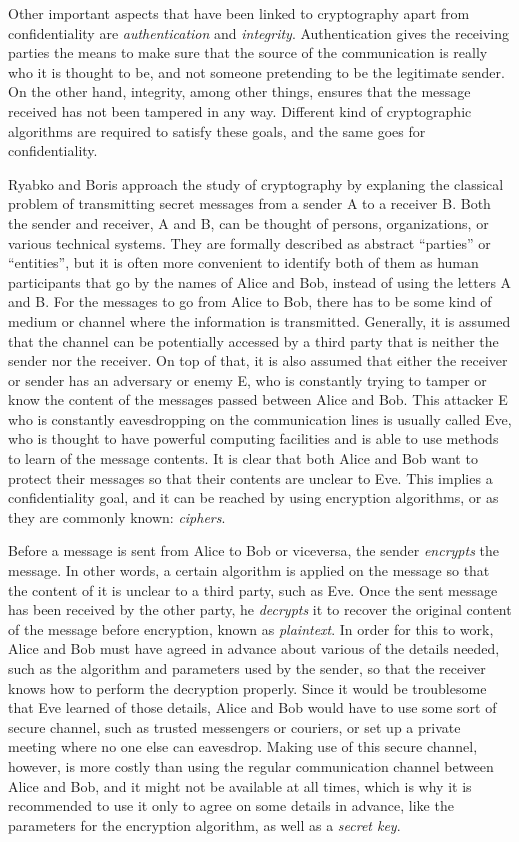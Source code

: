 Other important aspects that have been linked to cryptography apart from confidentiality are \textit{authentication} and \textit{integrity}. Authentication gives the receiving parties the means to make sure that the source of the communication is really who it is thought to be, and not someone pretending to be the legitimate sender. On the other hand, integrity, among other things, ensures that the message received has not been tampered in any way. Different kind of cryptographic algorithms are required to satisfy these goals, and the same goes for confidentiality.

Ryabko and Boris \cite{CryptoIT} approach the study of cryptography by explaning the classical problem of transmitting secret messages from a sender A to a receiver B. Both the sender and receiver, A and B, can be thought of persons, organizations, or various technical systems.  They are formally described as abstract ``parties'' or ``entities'', but it is often more convenient to identify both of them as human participants that go by the names of Alice and Bob, instead of using the letters A and B.
For the messages to go from Alice to Bob, there has to be some kind of medium or channel where the information is transmitted. Generally, it is assumed that the channel can be potentially accessed by a third party that is neither the sender nor the receiver. On top of that, it is also assumed that either the receiver or sender has an adversary or enemy E, who is constantly trying to tamper or know the content of the messages passed between Alice and Bob. This attacker E who is constantly eavesdropping on the communication lines is usually called Eve, who is thought to have powerful computing facilities and is able to use methods to learn of the message contents.  It is clear that both Alice and Bob want to protect their messages so that their contents are unclear to Eve. This implies a confidentiality goal, and it can be reached by using encryption algorithms, or as they are commonly known: \emph{ciphers}.

Before a message is sent from Alice to Bob or viceversa, the sender \textit{encrypts} the message. In other words, a certain algorithm is applied on the message so that the content of it is unclear to a third party, such as Eve. Once the sent message has been received by the other party, he \textit{decrypts} it to recover the original content of the message before encryption, known as \textit{plaintext}. In order for this to work, Alice and Bob must have agreed in advance about various of the details needed, such as the algorithm and parameters used by the sender, so that the receiver knows how to perform the decryption properly. Since it would be troublesome that Eve learned of those details, Alice and Bob would have to use some sort of secure channel, such as trusted messengers or couriers, or set up a private meeting where no one else can eavesdrop. Making use of this secure channel, however, is more costly than using the regular communication channel between Alice and Bob, and it might not be available at all times, which is why it is recommended to use it only to agree on some details in advance, like the parameters for the encryption algorithm, as well as a \emph{secret key}.

